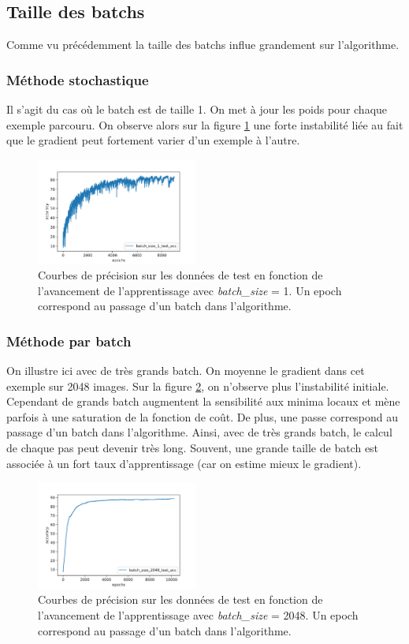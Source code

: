 \subsection{Taille des batchs}
Comme vu précédemment la taille des batchs influe grandement sur l'algorithme.

\subsubsection{Méthode stochastique}
Il s'agit du cas où le batch est de taille 1. On met à jour les poids pour chaque exemple parcouru. On observe alors sur la figure \ref{batch1} une forte instabilité liée au fait que le gradient peut fortement varier d'un exemple à l'autre.
\begin{figure}[!h]
\centering
\includegraphics[width=150pt]{"images/MLP/batch1"}
\caption{Courbes de précision sur les données de test en fonction de l'avancement de l'apprentissage avec \textit{batch\_size} = 1. Un epoch correspond au passage d'un batch dans l'algorithme. }
\label{batch1}
\end{figure}


\subsubsection{Méthode par batch}
On illustre ici avec de très grands batch. On moyenne le gradient dans cet exemple sur 2048 images. Sur la figure \ref{batch2}, on n'observe plus l'instabilité initiale. Cependant de grands batch augmentent la sensibilité aux minima locaux et mène parfois à une saturation de la fonction de coût. De plus, une passe correspond au passage d'un batch dans l'algorithme. Ainsi, avec de très grands batch, le calcul de chaque pas peut devenir très long. Souvent, une grande taille de batch est associée à un fort taux d'apprentissage (car on estime mieux le gradient).
\begin{figure}[!h]
\centering
\includegraphics[width=150pt]{"images/MLP/batch2048"}
\caption{Courbes de précision sur les données de test en fonction de l'avancement de l'apprentissage avec \textit{batch\_size} = 2048. Un epoch correspond au passage d'un batch dans l'algorithme. }
\label{batch2}
\end{figure}

